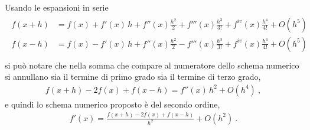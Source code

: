 \documentclass[letterpaper,10pt,italian]{jupyterBook}
\begin{document}
\sphinxAtStartPar
Usando le espansioni in serie
\begin{equation*}
\begin{split}\begin{aligned}
  f(x + h) & = f(x) + f'(x) \, h + f''(x) \frac{h^2}{2} + f'''(x) \frac{h^3}{3!} + f^{iv}(x) \frac{h^4}{4!} + O(h^5) \\ f(x - h) & = f(x) - f'(x) \, h + f''(x) \frac{h^2}{2} - f'''(x) \frac{h^3}{3!} + f^{iv}(x) \frac{h^4}{4!} + O(h^5) \\
\end{aligned}\end{split}
\end{equation*}
\sphinxAtStartPar
si può notare che nella somma che compare al numeratore dello schema numerico si annullano sia il termine di primo grado sia il termine di terzo grado,
\begin{equation*}
\begin{split}
 f(x+h) - 2 f(x) + f(x-h) = f''(x) \, h^2 + O(h^4) \ ,
\end{split}
\end{equation*}
\sphinxAtStartPar
e quindi lo schema numerico proposto è del secondo ordine,
\begin{equation*}
\begin{split}f'(x) = \frac{ f(x+h) - 2 f(x) + f(x-h) }{h^2} + O(h^2) \ .\end{split}
\end{equation*}
\end{document}
